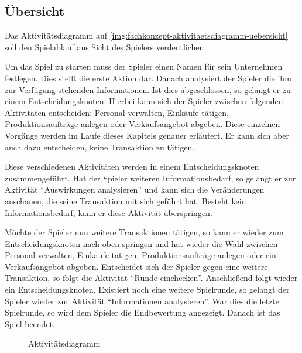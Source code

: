\subsection{Übersicht}
\label{sec:fachkonzept-aktivitaetsdiagramm}

Das Aktivitätsdiagramm auf \vref{img:fachkonzept-aktivitaetsdiagramm-uebersicht} soll den Spielablauf aus Sicht des Spielers verdeutlichen.  

Um das Spiel zu starten muss der Spieler einen Namen für sein Unternehmen festlegen. Dies stellt die erste Aktion dar. Danach analysiert der Spieler die ihm zur Verfügung stehenden Informationen. Ist dies abgeschlossen, so gelangt er zu einem Entscheidungsknoten. Hierbei kann sich der Spieler zwischen folgenden Aktivitäten entscheiden: Personal verwalten, Einkäufe tätigen, Produktionsaufträge anlegen oder Verkaufsangebot abgeben. Diese einzelnen Vorgänge werden im Laufe dieses Kapitels genauer erläutert. Er kann sich aber auch dazu entscheiden, keine Transaktion zu tätigen. 

Diese verschiedenen Aktivitäten werden in einem Entscheidungsknoten zusammengeführt. Hat der Spieler weiteren Informationsbedarf, so gelangt er zur Aktivität “Auswirkungen analysieren” und kann sich die Veränderungen anschauen, die seine Transaktion mit sich geführt hat. Besteht kein Informationsbedarf, kann er diese Aktivität überspringen. 

Möchte der Spieler nun weitere Transaktionen tätigen, so kann er wieder zum Entscheidungsknoten nach oben springen und hat wieder die Wahl zwischen Personal verwalten, Einkäufe tätigen, Produktionsaufträge anlegen oder ein Verkaufsangebot abgeben. Entscheidet sich der Spieler gegen eine weitere Transaktion, so folgt die Aktivität “Runde einchecken”. Anschließend folgt wieder ein Entscheidungsknoten. Existiert noch eine weitere Spielrunde, so gelangt der Spieler wieder zur Aktivität “Informationen analysieren”. War dies die letzte Spielrunde, so wird dem Spieler die Endbewertung angezeigt. Danach ist das Spiel beendet.

\begin{figure}[h]
  \centering
  \caption{Aktivitätsdiagramm}
  \label{img:fachkonzept-aktivitaetsdiagramm-uebersicht}
\end{figure}